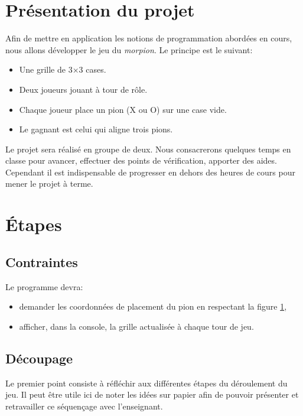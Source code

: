 \documentclass[a4paper,11pt]{article}
\begin{document}
\begin{Form}
\section{Présentation du projet}
Afin de mettre en application les notions de programmation abordées en cours, nous allons développer le jeu du \emph{morpion}. Le principe est le suivant:
\begin{itemize}
\item Une grille de 3×3 cases.
\item Deux joueurs jouant à tour de rôle.
\item Chaque joueur place un pion (X ou O) sur une case vide.
\item Le gagnant est celui qui aligne trois pions.
\end{itemize}
\medskip
Le projet sera réalisé en groupe de deux. Nous consacrerons quelques temps en classe pour avancer, effectuer des points de vérification, apporter des aides. Cependant il est indispensable de progresser en dehors des heures de cours pour mener le projet à terme. 
\section{Étapes}
\subsection{Contraintes}
Le programme devra:
\begin{itemize}
\item demander les coordonnées de placement du pion en respectant la figure \ref{grille},
\item afficher, dans la console, la grille actualisée à chaque tour de jeu.
\end{itemize}
\begin{figure}[!h]
\centering
{}
\label{grille}
\end{figure}

\subsection{Découpage}
Le premier point consiste à réfléchir aux différentes étapes du déroulement du jeu. Il peut être utile ici de noter les idées sur papier afin de pouvoir présenter et retravailler ce séquençage avec l'enseignant.

\end{Form}
\end{document}
